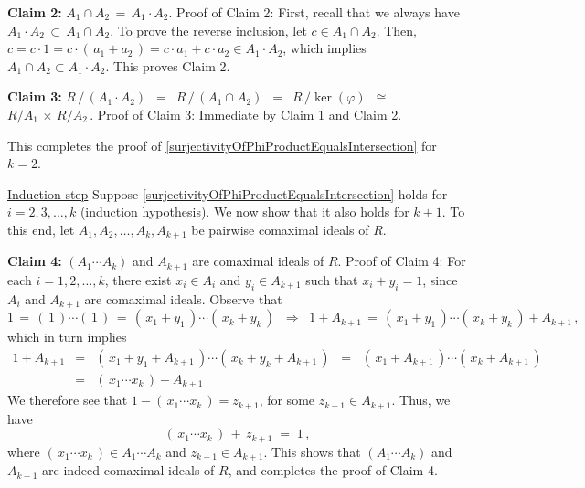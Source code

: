 \begin{enumerate}
	\vskip 0.3cm
	\textbf{Claim 2:}\;\; $A_{1} \cap A_{2} \, = \, A_{1} \cdot A_{2}$.
	\vskip 0.01cm
	\noindent
	Proof of Claim 2:\;\;
	First, recall that we always have $A_{1} \cdot A_{2} \, \subset \, A_{1} \cap A_{2}$.
	To prove the reverse inclusion, let $c \in A_{1} \cap A_{2}$.
	Then, $c = c \cdot 1 = c \cdot (\,a_{1} + a_{2}\,) = c \cdot a_{1} + c \cdot a_{2} \in A_{1} \cdot A_{2}$,
	which implies $A_{1} \cap A_{2} \subset A_{1} \cdot A_{2}$.
	This proves Claim 2.

	\vskip 0.3cm
	\textbf{Claim 3:}\;\;
	$R \,/\, (A_{1} \cdot A_{2})$
	\,$=$\,
		$R \,/\, (A_{1} \cap A_{2})$
	\,$=$\,
		$R \,/ \ker(\varphi)$
	\,$\cong$\,
		$R/A_{1} \,\times\, R/A_{2}$\,.
	\vskip 0.01cm
	\noindent
	Proof of Claim 3:\;\;
	Immediate by Claim 1 and Claim 2.
	
	\vskip 0.3cm
	\noindent
	This completes the proof of \eqref{surjectivityOfPhiProductEqualsIntersection}
	for $k = 2$.

	\vskip 0.5cm
	\underline{Induction step}\quad
	Suppose \eqref{surjectivityOfPhiProductEqualsIntersection} holds
	for $i = 2, 3, \ldots, k$ (induction hypothesis).
	We now show that it also holds for $k + 1$.
	To this end, let $A_{1}, A_{2}, \ldots, A_{k}, A_{k+1}$ be pairwise comaximal ideals of $R$.

	\vskip 0.3cm
	\textbf{Claim 4:}\;\;
	$(A_{1} \cdots A_{k})$ and $A_{k+1}$ are comaximal ideals of $R$.
	\vskip 0.01cm
	\noindent
	Proof of Claim 4:\;\;
	For each $i = 1, 2, \ldots, k$, there exist $x_{i} \in A_{i}$ and $y_{i} \in A_{k+1}$
	such that $x_{i} + y_{i} = 1$, since $A_{i}$ and $A_{k+1}$ are comaximal ideals.
	Observe that
	\begin{equation*}
		1
		\, = \,
			(\,1\,) \cdots (\,1\,)
		\, = \,
			(\,x_{1} + y_{1}\,) \cdots (\,x_{k} + y_{k}\,)
	\;\;\Longrightarrow\;\;
		1 + A_{k+1}
		\, = \,
			(\,x_{1} + y_{1}\,) \cdots (\,x_{k} + y_{k}\,) + A_{k+1}\,,
	\end{equation*}
	which in turn implies
	\begin{eqnarray*}
	1 + A_{k+1}
	& = &
		(\,x_{1} + y_{1} + A_{k+1}\,) \cdots (\,x_{k} + y_{k} + A_{k+1}\,)
	\;\; = \;\;
		(\,x_{1} + A_{k+1}\,) \cdots (\,x_{k} + A_{k+1}\,)
	\\
	& = &
		(\,x_{1} \cdots x_{k}\,) + A_{k+1}
	\end{eqnarray*}
	We therefore see that $1 - (\,x_{1} \cdots x_{k}\,) = z_{k+1}$,
	for some $z_{k+1} \in A_{k+1}$.
	Thus, we have
	\begin{equation*}
	(\,x_{1} \cdots x_{k}\,) \, + \, z_{k+1} \; = \; 1\,,
	\end{equation*}
	where $(\,x_{1} \cdots x_{k}\,) \in A_{1} \cdots A_{k}$ and
	$z_{k+1} \in A_{k+1}$.
	This shows that $(A_{1} \cdots A_{k})$ and $A_{k+1}$
	are indeed comaximal ideals of $R$, and completes the proof of Claim 4.
	

\end{enumerate}
